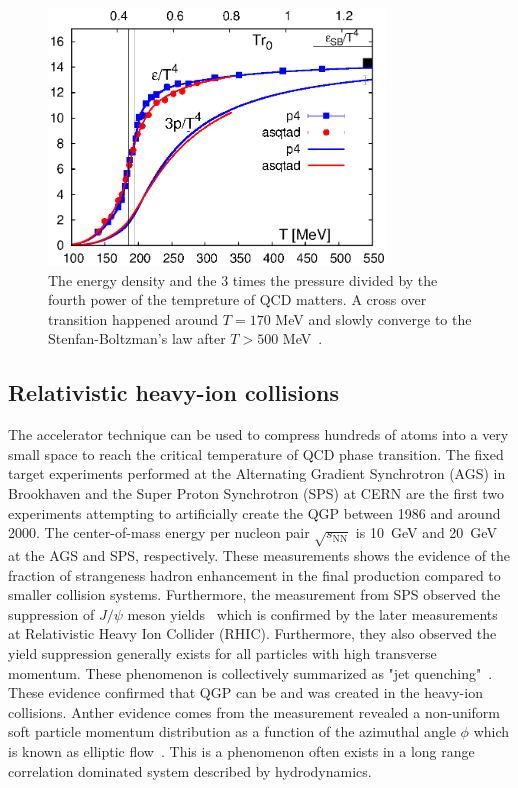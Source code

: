 \begin{figure}[ht]
  \begin{center}
    \includegraphics[width=0.8\textwidth]{figures/introduction/energy_3p_MeV_p4_asqtad.eps}
  \end{center}
  \caption{The energy density and the 3 times the pressure divided by the fourth power of the tempreture of QCD matters. A cross over transition happened around $T=170$ MeV and slowly converge to the Stenfan-Boltzman's law after $T>500$ MeV~\cite{Bazavov:2009zn}.}
  \label{fig:lattice_phase_transition}
\end{figure}

\subsection{Relativistic heavy-ion collisions}
The accelerator technique can be used to compress hundreds of atoms into a very small space to reach the critical temperature of QCD phase transition. The fixed target experiments performed at the Alternating Gradient Synchrotron (AGS) in Brookhaven and the Super Proton Synchrotron (SPS) at CERN are the first two experiments attempting to artificially create the QGP between 1986 and around 2000. The center-of-mass energy per nucleon pair $\sqrt{s_{\text{NN}}}$ is 10~GeV and 20~GeV at the AGS and SPS, respectively. These measurements shows the evidence of the fraction of strangeness hadron enhancement in the final production compared to smaller collision systems. Furthermore, the measurement from SPS observed the suppression of $J/ \psi$ meson yields~\cite{Heinz:2000bk} which is confirmed by the later measurements at Relativistic Heavy Ion Collider (RHIC). Furthermore, they also observed the yield suppression generally exists for all particles with high transverse momentum. These phenomenon is collectively summarized as "jet quenching"~\cite{Adams_2006,Bjorken:1982tu,Adare:2007vu}. These evidence confirmed that QGP can be and was created in the heavy-ion collisions. Anther evidence comes from the measurement revealed a non-uniform soft particle momentum distribution as a function of the azimuthal angle $\phi$ which is known as elliptic flow~\cite{Ackermann:2000tr}. This is a phenomenon often exists in a long range correlation dominated system described by hydrodynamics. 


